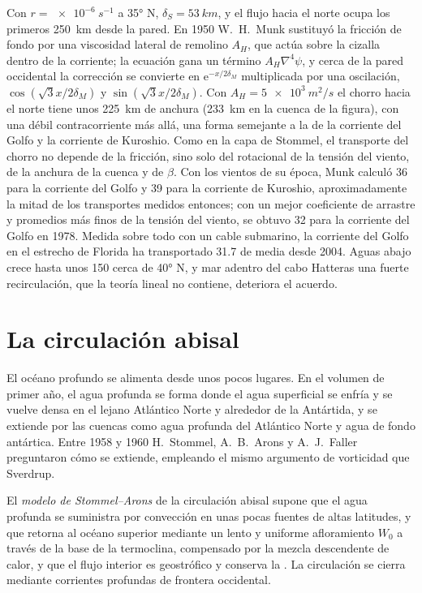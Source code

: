 Con $r = \qty{e-6}{s^{-1}}$ a \ang{35} N, $\delta_S = \qty{53}{km}$, y
el flujo hacia el norte ocupa los primeros \qty{250}{km} desde la pared. En 1950
W.~H.~Munk sustituyó la fricción de fondo por una viscosidad lateral de remolino $A_H$,
que actúa sobre la cizalla dentro de la corriente; la ecuación gana un término
$A_H\nabla^4\psi$, y cerca de la pared occidental la corrección se convierte en
$\mathrm e^{-x/2\delta_M}$ multiplicada por una oscilación, $\cos(\sqrt3x/2\delta_M)$
y $\sin(\sqrt3x/2\delta_M)$. Con $A_H = \qty{5e3}{m^2/s}$ el chorro hacia el norte
tiene unos \qty{225}{km} de anchura (\qty{233}{km} en la cuenca de la figura),
con una débil contracorriente más allá, una forma semejante a la de la corriente del Golfo y
la corriente de Kuroshio. Como en la capa de Stommel, el transporte del chorro no
depende de la fricción, sino solo del rotacional de la tensión del viento, de la anchura de la
cuenca y de $\beta$. Con los vientos de su época, Munk calculó
\qty{36}{\sverdrup} para la corriente del Golfo y \qty{39}{\sverdrup} para la
corriente de Kuroshio, aproximadamente la mitad de los transportes medidos entonces; con un mejor
coeficiente de arrastre y promedios más finos de la tensión del viento, se obtuvo \qty{32}{\sverdrup}
para la corriente del Golfo en 1978. Medida sobre todo con un cable submarino, la
corriente del Golfo en el estrecho de Florida ha transportado \qty{31.7}{\sverdrup} de
media desde 2004. Aguas abajo crece hasta unos \qty{150}{\sverdrup} cerca de
\ang{40} N, y mar adentro del cabo Hatteras una fuerte recirculación, que la
teoría lineal no contiene, deteriora el acuerdo.

\section{La circulación abisal}\label{sec:b3:ocean-dynamics:abyssal}

El océano profundo se alimenta desde unos pocos lugares. En el volumen de primer año, el agua profunda
se forma donde el agua superficial se enfría y se vuelve densa en el lejano Atlántico Norte
y alrededor de la Antártida, y se extiende por las cuencas como
agua profunda del Atlántico Norte y agua de fondo antártica. Entre 1958 y 1960
H.~Stommel, A.~B.~Arons y A.~J.~Faller preguntaron cómo se extiende, empleando el
mismo argumento de vorticidad que Sverdrup.

\begin{definition}\label{def:b3:ocean-dynamics:abyssal}
El \emph{modelo de Stommel--Arons} de la
circulación abisal supone que el agua profunda se suministra por convección en unas pocas
fuentes de altas latitudes, y que retorna al océano superior mediante un lento y uniforme
afloramiento $W_0$ a través de la base de la termoclina, compensado por la mezcla descendente
de calor, y que el flujo interior es geostrófico y conserva la
. La circulación se cierra mediante corrientes profundas de frontera
occidental.
\end{definition}

